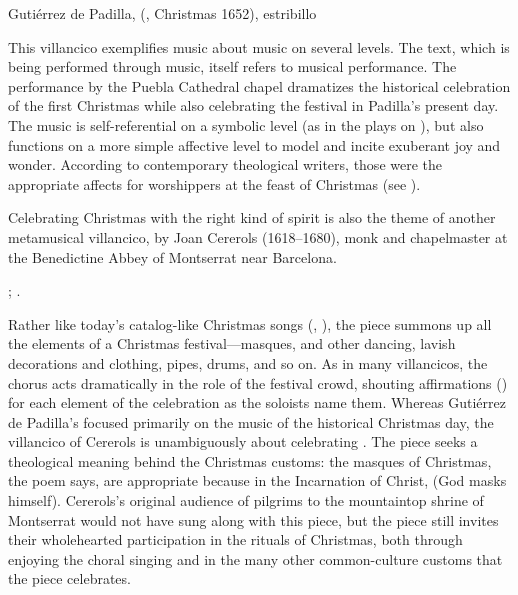 
{Gutiérrez de Padilla, 
(, Christmas 1652), estribillo}

This villancico exemplifies music about music on several levels.
The text, which is being performed through music, itself refers to musical
performance.
The performance by the Puebla Cathedral chapel dramatizes the historical
celebration of the first Christmas while also celebrating the festival in
Padilla's present day.  
The music is self-referential on a symbolic level (as in the plays on
), but also functions on a more simple affective level to model and
incite exuberant joy and wonder.
According to contemporary theological writers, those were the appropriate
affects for worshippers at the feast of Christmas (see
).


Celebrating Christmas with the right kind of spirit is also the theme of
another metamusical villancico,  by Joan
Cererols (1618--1680), monk and chapelmaster at the Benedictine Abbey of
Montserrat near Barcelona.%
\begin{Footnote}
    ; \autocite[81--94]{Cererols:MEM-VC}.
\end{Footnote}
Rather like today's catalog-like Christmas songs (,
), the piece summons up all the
elements of a Christmas festival---masques,  and other
dancing, lavish decorations and clothing, pipes, drums, and so on.
As in many villancicos, the chorus acts dramatically in the role of the
festival crowd, shouting affirmations () for each element of
the celebration as the soloists name them.  
Whereas Gutiérrez de Padilla's  focused
primarily on the music of the historical Christmas day, the villancico of
Cererols is unambiguously about celebrating .
The piece seeks a theological meaning behind the Christmas customs: the masques
of Christmas, the poem says, are appropriate because in the Incarnation of
Christ,  (God masks himself).
Cererols's original audience of pilgrims to the mountaintop shrine of
Montserrat would not have sung along with this piece, but the piece still
invites their wholehearted participation in the rituals of Christmas, both
through enjoying the choral singing and in the many other common-culture
customs that the piece celebrates.

